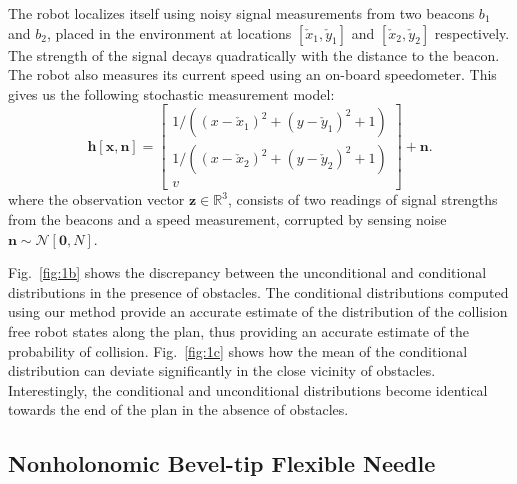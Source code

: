 The robot localizes itself using noisy signal measurements from two beacons $b_1$ and $b_2$, placed in the environment at locations $[\check{x}_1, \check{y}_1]$ and $[\check{x}_2, \check{y}_2]$ respectively. The strength of the signal decays quadratically with the distance to the beacon. The robot also measures its current speed using an on-board speedometer. %
This gives us the following stochastic measurement model:
\begin{equation}
\mathbf{h}[\mathbf{x}, \mathbf{n}] = \begin{bmatrix} 1/((x - \check{x}_1)^2 + (y - \check{y}_1)^2 + 1) \\ 1/((x - \check{x}_2)^2 + (y - \check{y}_2)^2 + 1) \\ v \end{bmatrix} + \mathbf{n}.
\end{equation}
where the observation vector $\mathbf{z} \in \mathbb{R}^3$, consists of two readings of signal strengths from the beacons and a speed measurement, corrupted by sensing noise $\mathbf{n} \sim \mathcal{N}[\mathbf{0}, N]$.

Fig.\ \ref{fig:1b} shows the discrepancy between the unconditional and conditional distributions in the presence of obstacles. The conditional distributions computed using our method provide an accurate estimate of the distribution of the collision free robot states along the plan, thus providing an accurate estimate of the probability of collision. Fig.\ \ref{fig:1c} shows how the mean of the conditional distribution can deviate significantly in the close vicinity of obstacles. Interestingly, the conditional and unconditional distributions become identical towards the end of the plan in the absence of obstacles.

\subsection{Nonholonomic Bevel-tip Flexible Needle}

